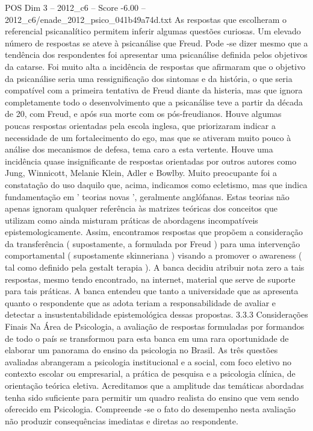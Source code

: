 \begin{textsample}{POS Dim 3 – 2012\_c6 – Score -6.00 – 2012\_c6/enade\_2012\_psico\_041b49a74d.txt}
As respostas que escolheram o referencial psicanalítico permitem inferir algumas questões curiosas.
Um elevado número de respostas se ateve à psicanálise que Freud.
Pode -se dizer mesmo que a tendência dos respondentes foi apresentar uma psicanálise definida pelos objetivos da catarse.
Foi muito alta a incidência de respostas que afirmaram que o objetivo da psicanálise seria uma ressignificação dos sintomas e da história, o que seria compatível com a primeira tentativa de Freud diante da histeria, mas que ignora completamente todo o desenvolvimento que a psicanálise teve a partir da década de 20, com Freud, e após sua morte com os pós-freudianos.
Houve algumas poucas respostas orientadas pela escola inglesa, que priorizaram indicar a necessidade de um fortalecimento do ego, mas que se ativeram muito pouco à análise dos mecanismos de defesa, tema caro a esta vertente.
Houve uma incidência quase insignificante de respostas orientadas por outros autores como Jung, Winnicott, Melanie Klein, Adler e Bowlby.
Muito preocupante foi a constatação do uso daquilo que, acima, indicamos como ecletismo, mas que indica fundamentação em ' teorias novas ', geralmente anglófanas.
Estas teorias não apenas ignoram qualquer referência às matrizes teóricas dos conceitos que utilizam como ainda misturam práticas de abordagens incompatíveis epistemologicamente.
Assim, encontramos respostas que propõem a consideração da transferência ( supostamente, a formulada por Freud ) para uma intervenção comportamental ( supostamente skinneriana ) visando a promover o awareness ( tal como definido pela gestalt terapia ).
A banca decidiu atribuir nota zero a tais respostas, mesmo tendo encontrado, na internet, material que serve de suporte para tais práticas.
A banca entendeu que tanto a universidade que as apresenta quanto o respondente que as adota teriam a responsabilidade de avaliar e detectar a insustentabilidade epistemológica dessas propostas. 3.3.3 Considerações Finais Na Área de Psicologia, a avaliação de respostas formuladas por formandos de todo o país se transformou para esta banca em uma rara oportunidade de elaborar um panorama do ensino da psicologia no Brasil.
As três questões avaliadas abrangeram a psicologia institucional e a social, com foco eletivo no contexto escolar ou empresarial, a prática de pesquisa e a psicologia clínica, de orientação teórica eletiva.
Acreditamos que a amplitude das temáticas abordadas tenha sido suficiente para permitir um quadro realista do ensino que vem sendo oferecido em Psicologia.
Compreende -se o fato do desempenho nesta avaliação não produzir consequências imediatas e diretas ao respondente.

\end{textsample}
